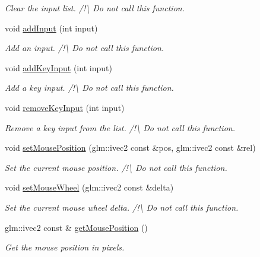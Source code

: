 \begin{DoxyCompactItemize}
\begin{DoxyCompactList}\small\item\em Clear the input list. /!\textbackslash{} Do not call this function. \end{DoxyCompactList}\item 
void \hyperlink{classgdl_1_1_input_a7a175a63e780f1aa0fdebba68c0e8850}{add\-Input} (int input)
\begin{DoxyCompactList}\small\item\em Add an input. /!\textbackslash{} Do not call this function. \end{DoxyCompactList}\item 
void \hyperlink{classgdl_1_1_input_aa3380058a91f20b4889371ea07fd2bb4}{add\-Key\-Input} (int input)
\begin{DoxyCompactList}\small\item\em Add a key input. /!\textbackslash{} Do not call this function. \end{DoxyCompactList}\item 
void \hyperlink{classgdl_1_1_input_a531d2a805f5fdd33a0ce70ad74d0b3f8}{remove\-Key\-Input} (int input)
\begin{DoxyCompactList}\small\item\em Remove a key input from the list. /!\textbackslash{} Do not call this function. \end{DoxyCompactList}\item 
void \hyperlink{classgdl_1_1_input_aa6be10489840280271415ec1311ce5af}{set\-Mouse\-Position} (glm\-::ivec2 const \&pos, glm\-::ivec2 const \&rel)
\begin{DoxyCompactList}\small\item\em Set the current mouse position. /!\textbackslash{} Do not call this function. \end{DoxyCompactList}\item 
void \hyperlink{classgdl_1_1_input_a4864b681a18a087443024160861587fb}{set\-Mouse\-Wheel} (glm\-::ivec2 const \&delta)
\begin{DoxyCompactList}\small\item\em Set the current mouse wheel delta. /!\textbackslash{} Do not call this function. \end{DoxyCompactList}\item 
glm\-::ivec2 const \& \hyperlink{classgdl_1_1_input_afa2d25f94d2223a056be6fb5bcda935b}{get\-Mouse\-Position} ()
\begin{DoxyCompactList}\small\item\em Get the mouse position in pixels. \end{DoxyCompactList}\item 

\end{DoxyCompactItemize}
